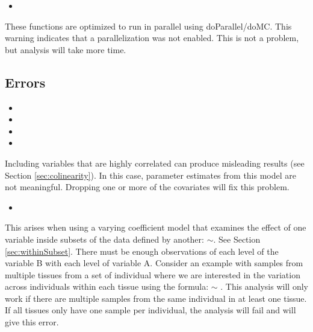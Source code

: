 \documentclass[12pt]{article}\usepackage[]{graphicx}\usepackage[]{xcolor}
\begin{document}
\begin{itemize}
  \item {}
\end{itemize}
These functions are optimized to run in parallel using doParallel/doMC.  This warning indicates that a parallelization was not enabled.  This is not a problem, but analysis will take more time.\\

\subsection{Errors}

\begin{itemize}
  \item {}
  \item {}
  \item {}
  \item {}
\end{itemize}
Including variables that are highly correlated can produce misleading results (see Section \ref{sec:colinearity}).  In this case, parameter estimates from this model are not meaningful.  Dropping one or more of the covariates will fix this problem.\\

\begin{itemize}
  \item {}
\end{itemize}
This arises when using a varying coefficient model that examines the effect of one variable inside subsets of the data defined by another: $\sim$.  See Section \ref{sec:withinSubset}. There must be enough observations of each level of the variable B with each level of variable A.  Consider an example with samples from multiple tissues from a set of individual where we are interested in the variation across individuals within each tissue using the formula: $\sim$ .  This analysis will only work if there are multiple samples from the same individual in at least one tissue.  If all tissues only have one sample per individual, the analysis will fail and  will give this error.\\
\end{document}
